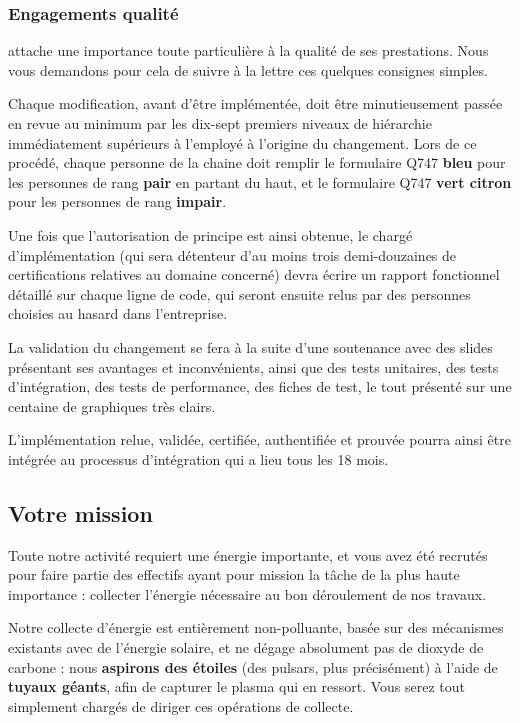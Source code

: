\subsubsection{Engagements qualité}

\provogon{} attache une importance toute particulière à la qualité de ses
prestations. Nous vous demandons pour cela de suivre à la lettre ces quelques
consignes simples.

Chaque modification, avant d'être implémentée, doit être minutieusement passée
en revue au minimum par les dix-sept premiers niveaux de hiérarchie
immédiatement supérieurs à l'employé à l'origine du changement.  Lors de ce
procédé, chaque personne de la chaine doit remplir le formulaire Q747
\textbf{bleu} pour les personnes de rang \textbf{pair} en partant du haut, et
le formulaire Q747 \textbf{vert citron} pour les personnes de rang
\textbf{impair}.

Une fois que l'autorisation de principe est ainsi obtenue, le chargé
d'implémentation (qui sera détenteur d'au moins trois demi-douzaines de
certifications relatives au domaine concerné) devra écrire un rapport
fonctionnel détaillé sur chaque ligne de code, qui seront ensuite relus par des
personnes choisies au hasard dans l'entreprise.

La validation du changement se fera à la suite d'une soutenance avec des slides
présentant ses avantages et inconvénients, ainsi que des tests unitaires, des
tests d'intégration, des tests de performance, des fiches de test, le tout
présenté sur une centaine de graphiques très clairs.

L'implémentation relue, validée, certifiée, authentifiée et prouvée pourra
ainsi être intégrée au processus d'intégration qui a lieu tous les 18 mois.

\subsection{Votre mission}
\label{sec:mission}

Toute notre activité requiert une énergie importante, et vous avez été recrutés
pour faire partie des effectifs ayant pour mission la tâche de la plus haute
importance : collecter l'énergie nécessaire au bon déroulement de nos travaux.

Notre collecte d'énergie est entièrement non-polluante, basée sur des
mécanismes existants avec de l'énergie solaire, et ne dégage absolument pas de
dioxyde de carbone : nous \textbf{aspirons des étoiles} (des pulsars, plus
précisément) à l'aide de \textbf{tuyaux géants}, afin de capturer le plasma qui
en ressort. Vous serez tout simplement chargés de diriger ces opérations de
collecte.

